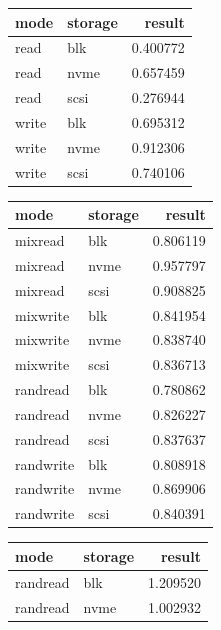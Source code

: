 \documentclass[twocolumn]{article}
\begin{document}
    \begin{table}
        \label{tab:experimentasdasdas-environment}
        \begin{tabular}{llr}
            \hline
            \textbf{mode}& \textbf{storage} & \textbf{result} \\
            \hline
            read  & blk  & 0.400772 \\
            read  & nvme & 0.657459 \\
            read  & scsi & 0.276944 \\
            write & blk  & 0.695312 \\
            write & nvme & 0.912306 \\
            write & scsi & 0.740106 \\ 
            \hline
        \end{tabular}
        \hfill
        \label{tab:sadasdasdasdasd-environment}
        \begin{tabular}{llr}
            \hline
            \textbf{mode}& \textbf{storage} & \textbf{result} \\
            \hline
            mixread   & blk  & 0.806119 \\
            mixread   & nvme & 0.957797 \\
            mixread   & scsi & 0.908825 \\
            mixwrite  & blk  & 0.841954 \\
            mixwrite  & nvme & 0.838740 \\
            mixwrite  & scsi & 0.836713 \\
            randread  & blk  & 0.780862 \\
            randread  & nvme & 0.826227 \\
            randread  & scsi & 0.837637 \\
            randwrite & blk  & 0.808918 \\
            randwrite & nvme & 0.869906 \\
            randwrite & scsi & 0.840391 \\
            \hline
        \end{tabular}
        \hfill
        \label{tab:experimasdasdasdadsent-environment}
        \begin{tabular}{llr}
            \hline
            \textbf{mode}& \textbf{storage} & \textbf{result} \\
            \hline
            randread  & blk  & 1.209520 \\
            randread  & nvme & 1.002932 \\

\end{tabular}
\end{table}
\end{document}
